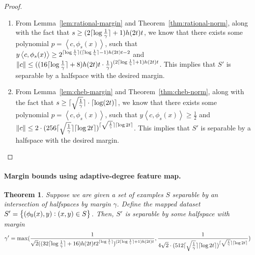 \documentclass{article}
\DeclarePairedDelimiter\ceil{\lceil}{\rceil}
\newcommand{\inner}[1]{ \left\langle {#1} \right\rangle }
\newtheorem{theorem}{Theorem}
\begin{document}
\begin{proof}
\begin{enumerate}
\item From Lemma~\ref{lem:rational-margin} and Theorem~\ref{thm:rational-norm},
along with the fact that $s \geq (2\ceil{\log \frac 1 \gamma}+1) h(2t) t$,
we know that there exists some polynomial $p = \inner{c, \phi_s(x)}$, such that
$y \inner{c, \phi_s(x)} \geq  2^{\ceil{\log \frac 1 \gamma}(\ceil{\log \frac 1 \gamma}-1)h(2t)t - 2}$ and
$\|c\| \leq ((16\ceil{\log \frac 1 \gamma}+8) h(2t) t \cdot \frac 1 \gamma)^{(2\ceil{\log \frac 1 \gamma}+1)h(2t)t}$. This implies that $S'$ is separable by a halfspace with the desired margin.

\item From Lemma~\ref{lem:cheb-margin} and Theorem~\ref{thm:cheb-norm},
along with the fact that $s \geq \ceil{\sqrt{\frac1\gamma}} \cdot \ceil{\log(2t)}$, we know that there exists some polynomial $p = \inner{c, \phi_s(x)}$, such that
$y \inner{c, \phi_s(x)} \geq \frac 1 2$ and
$\| c \| \leq 2 \cdot (256 \ceil{\sqrt{\frac1\gamma}} \ceil{\log 2t})^{\ceil{\sqrt{\frac1\gamma}} \ceil{\log 2t}}$. This implies that $S'$ is separable by a halfspace with the desired margin.
\end{enumerate}
\end{proof}


\paragraph{Margin bounds using adaptive-degree feature map.}
\begin{theorem}
Suppose we are given a set of examples $S$ separable by an intersection of halfspaces by margin $\gamma$. Define the mapped dataset $S'=\cbr{(\phi_0(x),y): (x,y) \in S}$. Then, $S'$ is separable by some halfspace with margin
\[
\gamma' =
\max(
\frac{1}{ \sqrt{2} ( (32 \ceil{\log \frac 1 \gamma} + 16 ) h(2t) t 2^{\ceil{\log \frac 1 \gamma}})^{(2\ceil{\log \frac 1 \gamma} + 1 ) h(2t) t} },
\frac{1}{4 \sqrt{2} \cdot (512 \ceil{\sqrt{\frac1\gamma}} \ceil{\log 2t})^{\ceil{\sqrt{\frac1\gamma}} \ceil{\log 2t}}}
)
\]
\end{theorem}
\end{document}
